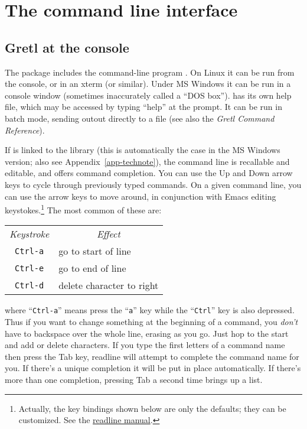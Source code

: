 \chapter{The command line interface}
\label{cli}

\section{Gretl at the console}
\label{cli-console}

The  package includes the command-line program
. On Linux it can be run from the console, or in an
xterm (or similar).  Under MS Windows it can be run in a console
window (sometimes inaccurately called a ``DOS box'').  
has its own help file, which may be accessed by typing ``help'' at the
prompt. It can be run in batch mode, sending outout directly to a file
(see also the \emph{Gretl Command Reference}).
    
If  is linked to the  library (this is
automatically the case in the MS Windows version; also see
Appendix~\ref{app-technote}), the command line is recallable and
editable, and offers command completion.  You can use the Up and Down
arrow keys to cycle through previously typed commands.  On a given
command line, you can use the arrow keys to move around, in
conjunction with Emacs editing keystokes.\footnote{Actually, the key
  bindings shown below are only the defaults; they can be customized.
  See the
  \href{http://cnswww.cns.cwru.edu/~chet/readline/readline.html}{readline
    manual}.} The most common of these are:
%    
\begin{center}
  \begin{tabular}{cl}
    \textit{Keystroke} & \multicolumn{1}{c}{\textit{Effect}}\\
    \verb+Ctrl-a+ & go to start of line\\
    \verb+Ctrl-e+ & go to end of line\\
    \verb+Ctrl-d+ & delete character to right\\
  \end{tabular}
\end{center}
%
where ``\verb+Ctrl-a+'' means press the ``\verb+a+'' key while the
``\verb+Ctrl+'' key is also depressed.  Thus if you want to change
something at the beginning of a command, you \emph{don't} have to
backspace over the whole line, erasing as you go.  Just hop to the
start and add or delete characters.  If you type the first letters of
a command name then press the Tab key, readline will attempt to
complete the command name for you.  If there's a unique completion it
will be put in place automatically.  If there's more than one
completion, pressing Tab a second time brings up a list.

